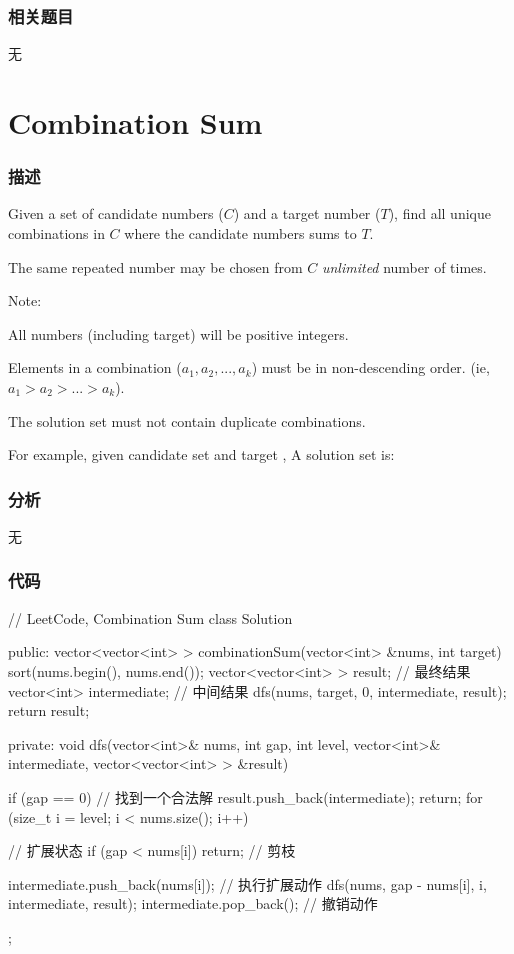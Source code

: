 \subsubsection{相关题目}
\begindot
\item 无
\myenddot


\section{Combination Sum} %
\label{sec:combination-sum}


\subsubsection{描述}
Given a set of candidate numbers ($C$) and a target number ($T$), find all unique combinations in $C$ where the candidate numbers sums to $T$.

The same repeated number may be chosen from $C$ \emph{unlimited} number of times.

Note:
\begindot
\item All numbers (including target) will be positive integers.
\item Elements in a combination ($a_1, a_2, ..., a_k$) must be in non-descending order. (ie, $a_1 > a_2 > ... > a_k$).
\item The solution set must not contain duplicate combinations.
\myenddot

For example, given candidate set  and target , 
A solution set is: 
\begin{Code}
[7] 
[2, 2, 3] 
\end{Code}


\subsubsection{分析}
无


\subsubsection{代码}
\begin{Code}
// LeetCode, Combination Sum
class Solution {
public:
    vector<vector<int> > combinationSum(vector<int> &nums, int target) {
        sort(nums.begin(), nums.end());
        vector<vector<int> > result; // 最终结果
        vector<int> intermediate; // 中间结果
        dfs(nums, target, 0, intermediate, result);
        return result;
    }

private:
    void dfs(vector<int>& nums, int gap, int level, vector<int>& intermediate,
            vector<vector<int> > &result) {
        if (gap == 0) {  // 找到一个合法解
            result.push_back(intermediate);
            return;
        }
        for (size_t i = level; i < nums.size(); i++) { // 扩展状态
            if (gap < nums[i]) return; // 剪枝

            intermediate.push_back(nums[i]); // 执行扩展动作
            dfs(nums, gap - nums[i], i, intermediate, result);
            intermediate.pop_back();  // 撤销动作
        }
    }
};
\end{Code}


